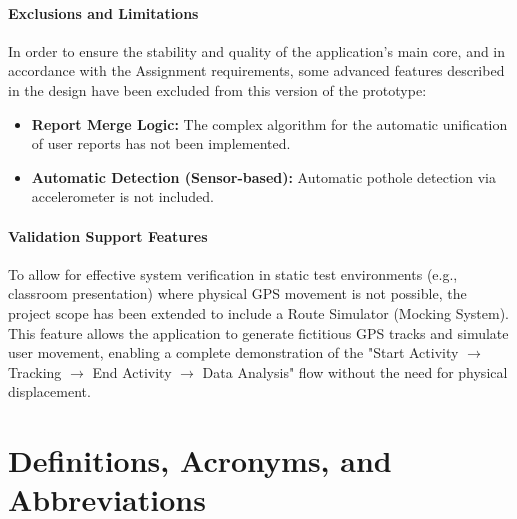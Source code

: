 \paragraph{Exclusions and Limitations}
In order to ensure the stability and quality of the application's main core, and in accordance with the Assignment requirements, some advanced features described in the design have been excluded from this version of the prototype:
\begin{itemize}
    \item \textbf{Report Merge Logic:} The complex algorithm for the automatic unification of user reports has not been implemented.
    \item \textbf{Automatic Detection (Sensor-based):} Automatic pothole detection via accelerometer is not included.
\end{itemize}

\paragraph{Validation Support Features}
To allow for effective system verification in static test environments (e.g., classroom presentation) where physical GPS movement is not possible, the project scope has been extended to include a Route Simulator (Mocking System). This feature allows the application to generate fictitious GPS tracks and simulate user movement, enabling a complete demonstration of the "Start Activity $\rightarrow$ Tracking $\rightarrow$ End Activity $\rightarrow$ Data Analysis" flow without the need for physical displacement.

\section{Definitions, Acronyms, and Abbreviations}
